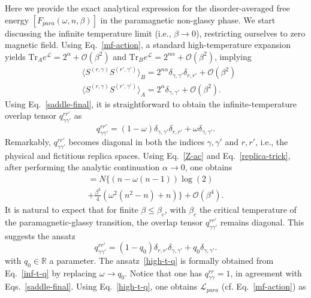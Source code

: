 \documentclass[twocolumn,superscriptaddress,prb,10pt]{revtex4-1}
\def\tr{\textrm{Tr}}
\begin{document}
Here we provide the exact analytical expression for the disorder-averaged free 
energy $[F_{para}(\omega,n,\beta)]$  in the paramagnetic non-glassy phase. 
We start discussing the infinite temperature limit (i.e., $\beta\to 0$), 
restricting ourselves to zero magnetic field. 
Using Eq.~\eqref{mf-action}, a standard high-temperature expansion yields 
$\tr_Ae^{{\mathcal L}}=2^{\alpha}+{\mathcal O}(\beta^2)$ and $\tr_B e^{{
\mathcal L}}=2^{n\alpha}+{\mathcal O}(\beta^2)$, implying  
%
\begin{align}
& \langle S^{(r,\gamma)}S^{(r',\gamma')}\rangle_B=2^{n\alpha}
\delta_{\gamma,\gamma'}\delta_{r,r'}+{\mathcal O}(\beta^2)\\
& \langle S^{(r,\gamma)}S^{(r',\gamma')}\rangle_A=2^{\alpha}
\delta_{\gamma,\gamma'}+{\mathcal O}(\beta^2).
\end{align}
%
Using Eq.~\eqref{saddle-final}, it is straightforward to obtain the 
infinite-temperature overlap tensor $q_{\gamma\gamma'}^{rr'}$ as 
%
\begin{equation}
q_{\gamma\gamma'}^{rr'}=(1-\omega)\delta_{\gamma,\gamma'}\delta_{r,r'}+
\omega\delta_{\gamma,\gamma'}.
\label{inf-t-q}
\end{equation}
%
Remarkably, $q_{\gamma\gamma'}^{rr'}$ becomes diagonal in both the 
indices $\gamma,\gamma'$ and $r,r'$, i.e., the physical and fictitious 
replica spaces. Using Eq.~\eqref{Z-ac} and Eq.~\eqref{replica-trick}, 
after performing the analytic continuation $\alpha\to 0$, one obtains  
%
\begin{multline}
[F_{para}(\omega,n,\beta)]=N\Big\{(n-\omega(n-1))\log(2)\\
+\frac{\beta^2}{4}(\omega^2(n^2-n)+n)\Big\}+
{\mathcal O}(\beta^4).
\label{logZ-ht}
\end{multline}
% 
It is natural to expect that for finite $\beta\le\beta_c$, with 
$\beta_c$ the critical temperature of the paramagnetic-glassy 
transition, the overlap tensor $q_{\gamma\gamma'}^{rr'}$ remains 
diagonal. This suggests the ansatz 
%
\begin{equation}
q_{\gamma\gamma'}^{rr'}=(1-q_0)\delta_{r,r'}\delta_{\gamma,\gamma'}+
q_0\delta_{\gamma,\gamma'}.
\label{high-t-q}
\end{equation}
%
with $q_0\in {\mathbb R}$ a parameter. The ansatz~\eqref{high-t-q} is formally 
obtained from Eq.~\eqref{inf-t-q} by replacing $\omega\to q_0$. Notice that 
one has $q_{\gamma\gamma}^{rr}=1$, in agreement with Eqs.~\eqref{saddle-final}. 
Using Eq.~\eqref{high-t-q}, one obtains ${\mathcal L}_{para}$ (cf. 
Eq.~\eqref{mf-action}) as   
\end{document}

